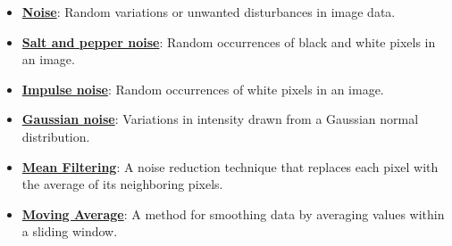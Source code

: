 \documentclass{article}%
\begin{document}
\begin{itemize}[leftmargin=*]
\item \href{https://purdue.brightspace.com/d2l/common/assets/pdfjs-d2l-dist/1.0.14-legacy/web/viewer.html?file=%2Fcontent%2Fenforced%2F1095467-wl.202510.CS.24300.001%2F07L2-Vision.pdf%3Fou%3D1095467&lang=en-us&container=d2l-fileviewer-rendered-pdf&fullscreen=d2l-fileviewer-rendered-pdf-dialog&height=667#page=33}{\textbf{Noise}}: Random variations or unwanted disturbances in image data.%
\item \href{https://purdue.brightspace.com/d2l/common/assets/pdfjs-d2l-dist/1.0.14-legacy/web/viewer.html?file=%2Fcontent%2Fenforced%2F1095467-wl.202510.CS.24300.001%2F07L2-Vision.pdf%3Fou%3D1095467&lang=en-us&container=d2l-fileviewer-rendered-pdf&fullscreen=d2l-fileviewer-rendered-pdf-dialog&height=667#page=36}{\textbf{Salt and pepper noise}}: Random occurrences of black and white pixels in an image.%
\item \href{https://purdue.brightspace.com/d2l/common/assets/pdfjs-d2l-dist/1.0.14-legacy/web/viewer.html?file=%2Fcontent%2Fenforced%2F1095467-wl.202510.CS.24300.001%2F07L2-Vision.pdf%3Fou%3D1095467&lang=en-us&container=d2l-fileviewer-rendered-pdf&fullscreen=d2l-fileviewer-rendered-pdf-dialog&height=667#page=36}{\textbf{Impulse noise}}: Random occurrences of white pixels in an image.%
\item \href{https://purdue.brightspace.com/d2l/common/assets/pdfjs-d2l-dist/1.0.14-legacy/web/viewer.html?file=%2Fcontent%2Fenforced%2F1095467-wl.202510.CS.24300.001%2F07L2-Vision.pdf%3Fou%3D1095467&lang=en-us&container=d2l-fileviewer-rendered-pdf&fullscreen=d2l-fileviewer-rendered-pdf-dialog&height=667#page=36}{\textbf{Gaussian noise}}: Variations in intensity drawn from a Gaussian normal distribution.%
\item \href{https://purdue.brightspace.com/d2l/common/assets/pdfjs-d2l-dist/1.0.14-legacy/web/viewer.html?file=%2Fcontent%2Fenforced%2F1095467-wl.202510.CS.24300.001%2F07L2-Vision.pdf%3Fou%3D1095467&lang=en-us&container=d2l-fileviewer-rendered-pdf&fullscreen=d2l-fileviewer-rendered-pdf-dialog&height=667#page=38}{\textbf{Mean Filtering}}: A noise reduction technique that replaces each pixel with the average of its neighboring pixels.%
\item \href{https://purdue.brightspace.com/d2l/common/assets/pdfjs-d2l-dist/1.0.14-legacy/web/viewer.html?file=%2Fcontent%2Fenforced%2F1095467-wl.202510.CS.24300.001%2F07L2-Vision.pdf%3Fou%3D1095467&lang=en-us&container=d2l-fileviewer-rendered-pdf&fullscreen=d2l-fileviewer-rendered-pdf-dialog&height=667#page=39}{\textbf{Moving Average}}: A method for smoothing data by averaging values within a sliding window.%

\end{itemize}
\end{document}
